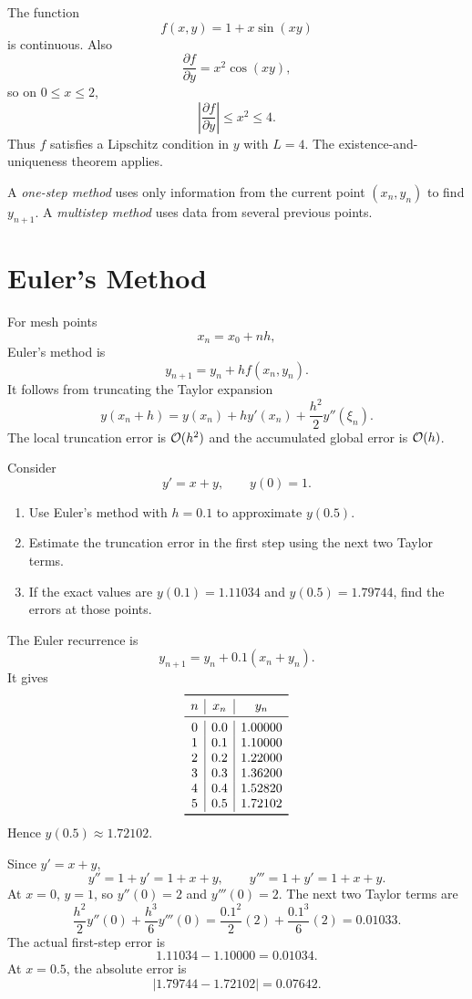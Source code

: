 \begin{solution}[3.8cm]
The function
\[
 f(x,y)=1+x\sin(xy)
\]
is continuous.  Also
\[
 \frac{\partial f}{\partial y}=x^2\cos(xy),
\]
so on $0\le x\le2$,
\[
 \left|\frac{\partial f}{\partial y}\right|
 \le x^2\le4.
\]
Thus $f$ satisfies a Lipschitz condition in $y$ with $L=4$.  The existence-and-uniqueness theorem applies.
\end{solution}

A \emph{one-step method} uses only information from the current point $(x_n,y_n)$ to find $y_{n+1}$.  A \emph{multistep method} uses data from several previous points.

\section{Euler's Method}

For mesh points
\[
 x_n=x_0+nh,
\]
Euler's method is
\[
 y_{n+1}=y_n+hf(x_n,y_n).
\]
It follows from truncating the Taylor expansion
\[
 y(x_n+h)=y(x_n)+hy'(x_n)+\frac{h^2}{2}y''(\xi_n).
\]
The local truncation error is $\mathcal O(h^2)$ and the accumulated global error is $\mathcal O(h)$.

\begin{example}
Consider
\[
 y'=x+y,
 \qquad y(0)=1.
\]
\begin{enumerate}[label=(\alph*),leftmargin=2.7em]
  \item Use Euler's method with $h=0.1$ to approximate $y(0.5)$.
  \item Estimate the truncation error in the first step using the next two Taylor terms.
  \item If the exact values are $y(0.1)=1.11034$ and $y(0.5)=1.79744$, find the errors at those points.
\end{enumerate}
\end{example}

\begin{solution}[9.5cm]
The Euler recurrence is
\[
 y_{n+1}=y_n+0.1(x_n+y_n).
\]
It gives
\[
\begin{array}{c|c|c}
\toprule
n&x_n&y_n\\
\midrule
0&0.0&1.00000\\
1&0.1&1.10000\\
2&0.2&1.22000\\
3&0.3&1.36200\\
4&0.4&1.52820\\
5&0.5&1.72102\\
\bottomrule
\end{array}
\]
Hence $y(0.5)\approx1.72102$.

Since $y'=x+y$,
\[
 y''=1+y'=1+x+y,
 \qquad
 y'''=1+y'=1+x+y.
\]
At $x=0$, $y=1$, so $y''(0)=2$ and $y'''(0)=2$.  The next two Taylor terms are
\[
 \frac{h^2}{2}y''(0)+\frac{h^3}{6}y'''(0)
 =\frac{0.1^2}{2}(2)+\frac{0.1^3}{6}(2)
 =0.01033.
\]
The actual first-step error is
\[
 1.11034-1.10000=0.01034.
\]
At $x=0.5$, the absolute error is
\[
 |1.79744-1.72102|=0.07642.
\]
\end{solution}

